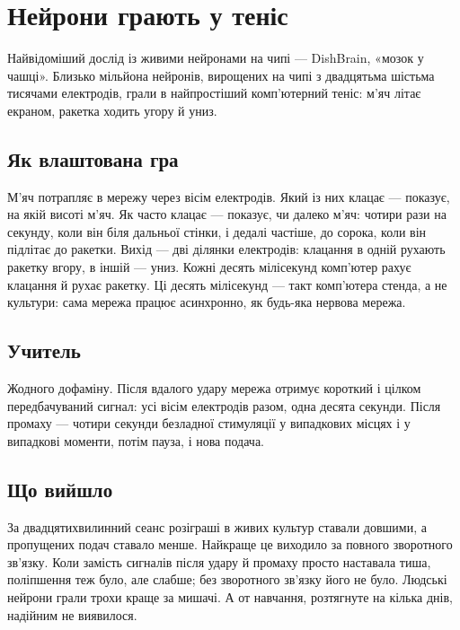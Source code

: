 \chapter{Нейрони грають у теніс}

Найвідоміший дослід із живими нейронами на чипі --- DishBrain, «мозок у чашці». Близько мільйона нейронів, вирощених на чипі з двадцятьма шістьма тисячами електродів, грали в найпростіший комп'ютерний теніс: м'яч літає екраном, ракетка ходить угору й униз.

\section*{Як влаштована гра}

М'яч потрапляє в мережу через вісім електродів. Який із них клацає --- показує, на якій висоті м'яч. Як часто клацає --- показує, чи далеко м'яч: чотири рази на секунду, коли він біля дальньої стінки, і дедалі частіше, до сорока, коли він підлітає до ракетки. Вихід --- дві ділянки електродів: клацання в одній рухають ракетку вгору, в іншій --- униз. Кожні десять мілісекунд комп'ютер рахує клацання й рухає ракетку. Ці десять мілісекунд --- такт комп'ютера стенда, а не культури: сама мережа працює асинхронно, як будь-яка нервова мережа.


\section*{Учитель}

Жодного дофаміну. Після вдалого удару мережа отримує короткий і цілком передбачуваний сигнал: усі вісім електродів разом, одна десята секунди. Після промаху --- чотири секунди безладної стимуляції у випадкових місцях і у випадкові моменти, потім пауза, і нова подача.

\section*{Що вийшло}

За двадцятихвилинний сеанс розіграші в живих культур ставали довшими, а пропущених подач ставало менше. Найкраще це виходило за повного зворотного зв'язку. Коли замість сигналів після удару й промаху просто наставала тиша, поліпшення теж було, але слабше; без зворотного зв'язку його не було. Людські нейрони грали трохи краще за мишачі. А от навчання, розтягнуте на кілька днів, надійним не виявилося.

